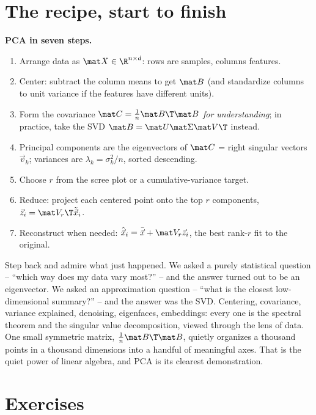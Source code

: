\section{The recipe, start to finish}

\begin{focusbox}
\textbf{PCA in seven steps.}
\begin{enumerate}
  \item Arrange data as $\mat X\in\R^{n\times d}$: rows are samples, columns features.
  \item Center: subtract the column means to get $\mat B$ (and standardize columns
        to unit variance if the features have different units).
  \item Form the covariance $\mat C=\tfrac1n\mat B\T\mat B$ \emph{for understanding};
        in practice, take the SVD $\mat B=\mat U\mat\Sigma\mat V\T$ instead.
  \item Principal components are the eigenvectors of $\mat C$ = right singular
        vectors $\vec v_k$; variances are $\lambda_k=\sigma_k^2/n$, sorted descending.
  \item Choose $r$ from the scree plot or a cumulative-variance target.
  \item Reduce: project each centered point onto the top $r$ components,
        $\vec z_i=\mat V_r\T\tilde{\vec x}_i$.
  \item Reconstruct when needed: $\hat{\vec x}_i=\bar{\vec x}+\mat V_r\vec z_i$, the
        best rank-$r$ fit to the original.
\end{enumerate}
\end{focusbox}

\begin{aestheticbox}
Step back and admire what just happened. We asked a purely statistical question --
``which way does my data vary most?'' -- and the answer turned out to be an
eigenvector. We asked an approximation question -- ``what is the closest
low-dimensional summary?'' -- and the answer was the SVD. Centering, covariance,
variance explained, denoising, eigenfaces, embeddings: every one is the spectral
theorem and the singular value decomposition, viewed through the lens of data. One
small symmetric matrix, $\tfrac1n\mat B\T\mat B$, quietly organizes a thousand
points in a thousand dimensions into a handful of meaningful axes. That is the
quiet power of linear algebra, and PCA is its clearest demonstration.
\end{aestheticbox}

\section*{Exercises}

